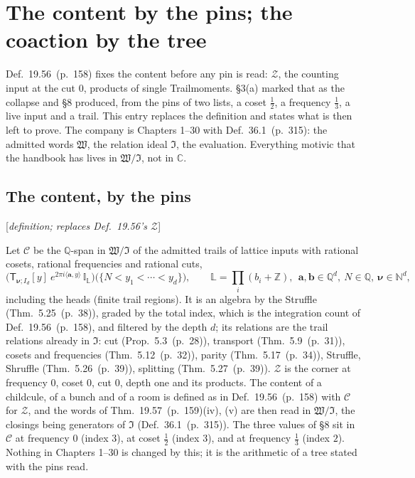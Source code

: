 \documentclass[11pt]{article}
\newcommand{\ip}[2]{\langle #1,#2\rangle}
\newcommand{\sT}{\mathsf T}
\newcommand{\Ilat}[1]{\mathbb I_{#1}}
\newcommand{\status}[1]{\hfill{\small[\textit{#1}]}}
\newcommand{\hb}[2]{#1~(p.~#2)}   %
\theoremstyle{plain}
\theoremstyle{remark}
\begin{document}
\section{The content by the pins; the coaction by the tree}

Def.~\hb{19.56}{158} fixes the content before any pin is read: $\mathcal Z$, the counting input at the cut $0$, products of single Trailmoments. \S3(a) marked that as the collapse and \S8 produced, from the pins of two lists, a coset $\frac12$, a frequency $\frac13$, a live input and a trail. This entry replaces the definition and states what is then left to prove. The company is Chapters 1--30 with Def.~\hb{36.1}{315}: the admitted words $\mathfrak W$, the relation ideal $\mathfrak I$, the evaluation. Everything motivic that the handbook has lives in $\mathfrak W/\mathfrak I$, not in $\mathbb C$.

\subsection{The content, by the pins}\status{definition; replaces Def.~19.56's $\mathcal Z$}

Let $\mathcal C$ be the $\mathbb Q$-span in $\mathfrak W/\mathfrak I$ of the admitted trails of lattice inputs with rational cosets, rational frequencies and rational cuts,
\[
\big(\sT_{\boldsymbol\nu;I_d}[y]\ e^{2\pi i\ip{\mathbf a}{y}}\,\Ilat{\mathbb L}\big)\big(\{N<y_1<\cdots<y_d\}\big),\qquad \mathbb L=\textstyle\prod_i(b_i+\mathbb Z),\ \ \mathbf a,\mathbf b\in\mathbb Q^d,\ N\in\mathbb Q,\ \boldsymbol\nu\in\mathbb N^d,
\]
including the heads (finite trail regions). It is an algebra by the Struffle (Thm.~\hb{5.25}{38}), graded by the total index, which is the integration count of Def.~\hb{19.56}{158}, and filtered by the depth $d$; its relations are the trail relations already in $\mathfrak I$: cut (Prop.~\hb{5.3}{28}), transport (Thm.~\hb{5.9}{31}), cosets and frequencies (Thm.~\hb{5.12}{32}), parity (Thm.~\hb{5.17}{34}), Struffle, Shruffle (Thm.~\hb{5.26}{39}), splitting (Thm.~\hb{5.27}{39}). $\mathcal Z$ is the corner at frequency $0$, coset $0$, cut $0$, depth one and its products. The content of a childcule, of a bunch and of a room is defined as in Def.~\hb{19.56}{158} with $\mathcal C$ for $\mathcal Z$, and the words of Thm.~\hb{19.57}{159}(iv), (v) are then read in $\mathfrak W/\mathfrak I$, the closings being generators of $\mathfrak I$ (Def.~\hb{36.1}{315}). The three values of \S8 sit in $\mathcal C$ at frequency $0$ (index $3$), at coset $\frac12$ (index $3$), and at frequency $\frac13$ (index $2$). Nothing in Chapters 1--30 is changed by this; it is the arithmetic of a tree stated with the pins read.
\end{document}

